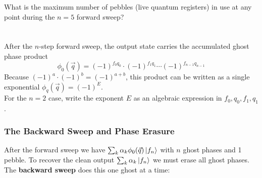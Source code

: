 What is the maximum number of pebbles (live quantum registers) in use at any point during the $n=5$ forward sweep? \\
\noindent{}
\newline \\\\
After the $n$-step forward sweep, the output state carries the accumulated ghost phase product
\begin{equation}
    \phi_0(\vec{q}) = (-1)^{f_0q_0} \cdot (-1)^{f_1q_1} \cdots (-1)^{f_{n-1}q_{n-1}}
\end{equation}
Because $(-1)^a \cdot (-1)^b = (-1)^{a+b}$, this product can be written as a single exponential $\phi_q(\vec{q}) = (-1)^E$. \\

For the $n=2$ case, write the exponent $E$ as an algebraic expression in $f_0, q_0, f_1, q_1$.\\
\noindent{}

\subsubsection{The Backward Sweep and Phase Erasure}
After the forward sweep we have $\sum_k \alpha_k \phi_0(\vec{q}) \ket{f_n}$ with $n$ ghost phases and 1 pebble. To recover the clean output $\sum_k \alpha_k \ket{f_n}$  we must erase all ghost phases. The \textbf{backward sweep} does this one ghost at a time:\\

